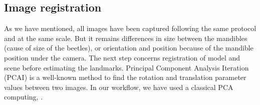\documentclass[twoside,twocolumn,10pt]{article}
\begin{document}
\subsection{Image registration}
As we have mentioned, all images have been captured following the same protocol and at the same scale. But it remains differences in size between the mandibles (cause of size of the beetles), or orientation and position because of the mandible position under the camera. The next step concerns registration of model and scene before estimating the landmarks. Principal Component Analysis Iteration (PCAI) is a well-known method to find the rotation and translation parameter values between two images. In our workflow, we have used a classical PCA computing\cite{bsspca}, \cite{shlens2014tutorial}.\\
\end{document}
